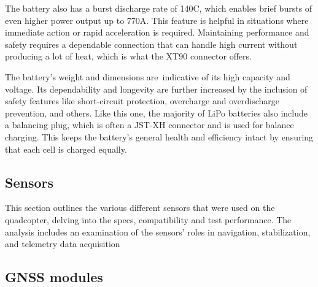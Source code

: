 \documentclass{article}
\begin{document}
The battery also has a burst discharge rate of 140C, which enables brief bursts of even higher power output up to 770A. This feature is helpful in situations where immediate action or rapid acceleration is required. Maintaining performance and safety requires a dependable connection that can handle high current without producing a lot of heat, 
which is what the XT90 connector offers.

The battery's weight and dimensions are indicative of its high capacity and voltage. Its dependability and longevity are further increased by the inclusion of safety features like short-circuit protection, overcharge and overdischarge prevention, and others. Like this one, the majority of LiPo batteries also include a balancing plug, which is 
often a JST-XH connector and is used for balance charging. This keeps the battery's general health and efficiency intact by ensuring that each cell is charged equally.

\subsection{Sensors}
This section outlines the various different sensors that were used on the quadcopter, delving into the specs, compatibility and test performance. The analysis includes an examination of the sensors' roles in navigation, stabilization, and telemetry data acquisition
\subsection*{GNSS modules}
\end{document}
